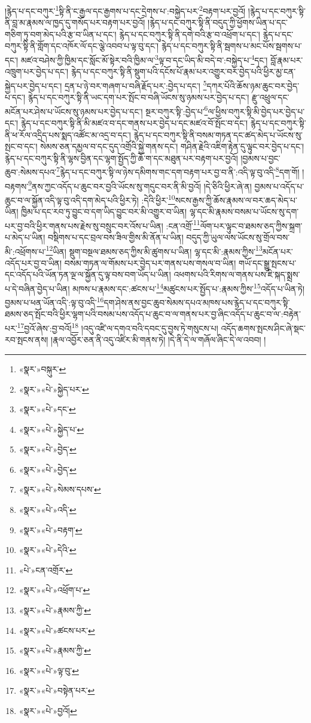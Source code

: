 །རྙེད་པ་དང་བཀུར་\footnote{«སྣར་»བསྐུར་}སྟི་ནི་ང་རྒྱལ་དང་རྒྱགས་པ་དང་དྲེགས་པ་:བསྐྱེད་པར་\footnote{«སྣར་»«པེ་»སྐྱེད་པར་}བརྟག་པར་བྱའོ། །རྙེད་པ་དང་བཀུར་སྟི་ནི་བླ་མ་རྣམས་ལ་ཁྱད་དུ་གསོད་པར་བརྟག་པར་བྱའོ། །རྙེད་པ་དང་བཀུར་སྟི་ནི་བདུད་ཀྱི་ཕྱོགས་ཡིན་པ་དང་གཅིག་ཏུ་བག་མེད་པའི་རྩ་བ་ཡིན་པ་དང་། རྙེད་པ་དང་བཀུར་སྟི་ནི་དགེ་བའི་རྩ་བ་འཕྲོག་པ་དང་། རྙེད་པ་དང་བཀུར་སྟི་ནི་གློག་དང་འཁོར་ལོ་དང་ལྕེ་འབབ་པ་ལྟ་བུ་དང་། རྙེད་པ་དང་བཀུར་སྟི་ནི་སྦགས་པ་མང་པོས་སྦགས་པ་དང་། མཛའ་བཤེས་ཀྱི་ཁྱིམ་དང་སློང་མོ་སྟེར་བའི་ཁྱིམ་ལ་\footnote{«སྣར་»«པེ་»དང་}ལྟ་བ་དང་ཡིད་མི་བདེ་བ་:བསྐྱེད་པ་\footnote{«སྣར་»«པེ་»སྐྱེད་པ་}དང་། བློ་རྣམ་པར་འཁྲུག་པར་བྱེད་པ་དང་། རྙེད་པ་དང་བཀུར་སྟི་ནི་སྡུག་པའི་དངོས་པོ་རྣམ་པར་འགྱུར་བར་བྱེད་པའི་ཕྱིར་མྱ་ངན་སྐྱེད་པར་བྱེད་པ་དང་། དྲན་པ་ཉེ་བར་གཞག་པ་བཞི་རྗོད་པར་:བྱེད་པ་དང་། \footnote{«སྣར་»«པེ་»བྱེད་}དཀར་པོའི་ཆོས་ཉམ་ཆུང་བར་བྱེད་པ་དང་། རྙེད་པ་དང་བཀུར་སྟི་ནི་ཡང་དག་པར་སྤོང་བ་བཞི་ཡོངས་སུ་ཉམས་པར་བྱེད་པ་དང་། རྫུ་འཕྲུལ་དང་མངོན་པར་ཤེས་པ་ཡོངས་སུ་ཉམས་པར་བྱེད་པ་དང་། སྔར་བཀུར་སྟི་:བྱེད་པ་\footnote{«སྣར་»«པེ་»བྱེད་}ལ་ཕྱིས་བཀུར་སྟི་མི་བྱེད་པར་བྱེད་པ་དང་། རྙེད་པ་དང་བཀུར་སྟི་ནི་མི་མཛའ་བ་དང་གནས་པར་བྱེད་པ་དང་མཛའ་བོ་སྤོང་བ་དང་། རྙེད་པ་དང་བཀུར་སྟི་ནི་ཕ་རོལ་འདྲིད་པས་སྨད་འཚོང་མ་འདྲ་བ་དང་། རྙེད་པ་དང་བཀུར་སྟི་ནི་བསམ་གཏན་དང་ཚད་མེད་པ་ཡོངས་སུ་སྤང་བ་དང་། སེམས་ཅན་དམྱལ་བ་དང་དུད་འགྲོའི་སྐྱེ་གནས་དང་། གཤིན་རྗེའི་འཇིག་རྟེན་དུ་ལྟུང་བར་བྱེད་པ་དང་། རྙེད་པ་དང་བཀུར་སྟི་ནི་ལྷས་བྱིན་དང་ལྷག་སྤྱོད་ཀྱི་ཆོ་ག་དང་མཐུན་པར་བརྟག་པར་བྱའོ། །བྱམས་པ་བྱང་ཆུབ་:སེམས་དཔའ་\footnote{«སྣར་»«པེ་»སེམས་དཔས་}རྙེད་པ་དང་བཀུར་སྟི་ལ་ཉེས་དམིགས་གང་དག་བརྟག་པར་བྱ་བ་ནི་:འདི་ལྟ་བུ་འདི་\footnote{«སྣར་»«པེ་»འདི་}དག་གོ། །བརྟགས་\footnote{«སྣར་»«པེ་»བརྟག་}ནས་ཀྱང་འདོད་པ་ཆུང་བར་བྱའི་ཡོངས་སུ་གདུང་བར་ནི་མི་བྱའོ། །དེ་ཅིའི་ཕྱིར་ཞེ་ན། བྱམས་པ་འདོད་པ་ཆུང་བ་ལ་སྐྱོན་འདི་ལྟ་བུ་འདི་དག་མེད་པའི་ཕྱིར་ཏེ། :དེའི་ཕྱིར་\footnote{«སྣར་»«པེ་»དེའི་}སངས་རྒྱས་ཀྱི་ཆོས་རྣམས་ལ་བར་ཆད་མེད་པ་ཡིན། ཁྱིམ་པ་དང་རབ་ཏུ་བྱུང་བ་དག་ཡིད་བྱུང་བར་མི་འགྱུར་བ་ཡིན། ལྷ་དང་མི་རྣམས་བསམ་པ་ཡོངས་སུ་དག་པར་བྱ་བའི་ཕྱིར་གནས་པས་རྗེས་སུ་བསྲུང་བར་འོས་པ་ཡིན། :ངན་འགྲོ་\footnote{«པེ་»ངན་འགྲོར་}ལོག་པར་ལྟུང་བ་ཐམས་ཅད་ཀྱིས་སྐྲག་པ་མེད་པ་ཡིན། བསྡིགས་པ་དང་བྲལ་བས་ཟིལ་གྱིས་མི་ནོན་པ་ཡིན། བདུད་ཀྱི་ཡུལ་ལས་ཡོངས་སུ་གྲོལ་བས་མི་:འཕྲོགས་པ་\footnote{«སྣར་»«པེ་»འཕྲོག་པ་}ཡིན། སྡུག་བསྔལ་ཐམས་ཅད་ཀྱིས་མི་ཚུགས་པ་ཡིན། ལྷ་དང་མི་:རྣམས་ཀྱིས་\footnote{«སྣར་»«པེ་»རྣམས་ཀྱི་}མངོན་པར་འདོད་པར་བྱ་བ་ཡིན། བསམ་གཏན་ལ་གོམས་པར་བྱེད་པར་གནས་པས་གསལ་བ་ཡིན། གཡོ་དང་སྒྱུ་སྤངས་པ་དང་འདོད་པའི་ཡོན་ཏན་ལྔ་ལ་སྐྱོན་དུ་ལྟ་བས་བག་ཡོད་པ་ཡིན། འཕགས་པའི་རིགས་ལ་གནས་པས་ཇི་སྐད་སྨྲས་པ་དེ་བཞིན་བྱེད་པ་ཡིན། མཁས་པ་རྣམས་དང་:ཚངས་པ་\footnote{«སྣར་»«པེ་»ཚངས་པར་}མཚུངས་པར་སྤྱོད་པ་:རྣམས་ཀྱིས་\footnote{«སྣར་»«པེ་»རྣམས་ཀྱི་}འདོད་པ་ཡིན་ཏེ། བྱམས་པ་ཕན་ཡོན་འདི་:ལྟ་བུ་འདི་\footnote{«སྣར་»«པེ་»ལྟ་བུ་}དག་ཤེས་ནས་བྱང་ཆུབ་སེམས་དཔའ་མཁས་པས་རྙེད་པ་དང་བཀུར་སྟི་ཐམས་ཅད་སྤོང་བའི་ཕྱིར་ལྷག་པའི་བསམ་པས་འདོད་པ་ཆུང་བ་ལ་གནས་པར་བྱ་ཞིང་འདོད་པ་ཆུང་བ་ལ་:བརྟེན་པར་\footnote{«སྣར་»«པེ་»བསྟེན་པར་}བྱའོ་ཞེས་:བྱ་བའོ།\footnote{«སྣར་»«པེ་»བྱའོ།} །འདུ་འཛི་ལ་དགའ་བའི་དབང་དུ་བྱས་ཏེ་གསུངས་པ། འདོད་ཆགས་སྤངས་ཤིང་ཞེ་སྡང་རབ་སྤངས་ནས། །རྣལ་འབྱོར་ཅན་ནི་འདུ་འཛིར་མི་གནས་ཏེ། །དེ་ནི་དེ་ལ་གཞོལ་ཞིང་དེ་ལ་འབབ། །
